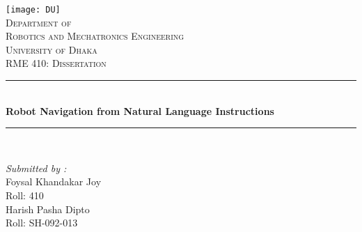 \begin{titlepage}
		\newcommand{\HRule}{\rule{\linewidth}{0.1mm}}
		\centering %
		
		\centering
		\texttt{[image: DU]}\\
		\textsc{\Large Department of\\ Robotics and Mechatronics Engineering}\\[0.5cm]
		\textsc{\LARGE University of Dhaka}\\[1.cm]
		
		\textsc{\Large RME 410: Dissertation}\\[0.5cm] %
		
		\HRule \\[.5cm]
		{ \LARGE \bfseries Robot Navigation from Natural Language Instructions}\\[0.1cm] %
		\HRule \\[1.5cm]
		
		
		\begin{minipage}{0.4\textwidth}
            \begin{flushleft} \large
                
                \emph{Submitted by :}\\
                Foysal Khandakar Joy\\
                Roll: 410\\[0.2cm]
                Harish Pasha Dipto\\
                Roll: SH-092-013\\
                

\end{flushleft}
\end{minipage}
\end{titlepage}
